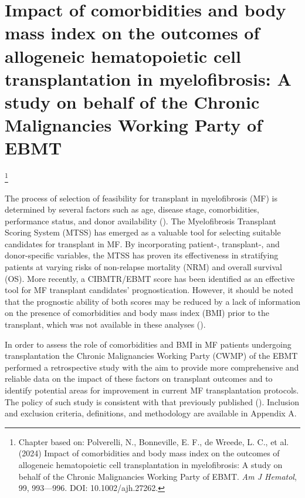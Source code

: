 \documentclass[
  letterpaper,
  paper=240mm:170mm,
  twoside=true,
  open=right,
  fontsize=10pt,
  pagesize=false,
  BCOR=15mm,
  DIV=14,
  headinclude=true,
  footinclude=false,
  headsepline=on]{scrbook}
\newcommand\blfootnote[1]{%
  \begingroup
  \renewcommand\thefootnote{}\footnote{#1}%
  \addtocounter{footnote}{-1}%
  \endgroup
}
\begin{document}

\chapter{Impact of comorbidities and body mass index on the outcomes of
allogeneic hematopoietic cell transplantation in myelofibrosis: A study
on behalf of the Chronic Malignancies Working Party of
EBMT}\label{sec-chap-polverelli}


\blfootnote{Chapter based on: Polverelli, N., Bonneville, E. F., de Wreede, L. C., et al. (2024) Impact of comorbidities and body mass index on the outcomes of allogeneic hematopoietic cell transplantation in myelofibrosis: A study on behalf of the Chronic Malignancies Working Party of EBMT. \textit{Am J Hematol}, 99, 993—996. DOI: 10.1002/ajh.27262.}

\clearpage

The process of selection of feasibility for transplant in myelofibrosis
(MF) is determined by several factors such as age, disease stage,
comorbidities, performance status, and donor availability
(). The Myelofibrosis Transplant Scoring System
(MTSS) has emerged as a valuable tool for selecting suitable candidates
for transplant in MF. By incorporating patient-, transplant-, and
donor-specific variables, the MTSS has proven its effectiveness in
stratifying patients at varying risks of non-relapse mortality (NRM) and
overall survival (OS). More recently, a CIBMTR/EBMT score has been
identified as an effective tool for MF transplant candidates'
prognostication. However, it should be noted that the prognostic ability
of both scores may be reduced by a lack of information on the presence
of comorbidities and body mass index (BMI) prior to the transplant,
which was not available in these analyses
().

In order to assess the role of comorbidities and BMI in MF patients
undergoing transplantation the Chronic Malignancies Working Party (CWMP)
of the EBMT performed a retrospective study with the aim to provide more
comprehensive and reliable data on the impact of these factors on
transplant outcomes and to identify potential areas for improvement in
current MF transplantation protocols. The policy of such study is
consistent with that previously published
(). Inclusion and exclusion criteria, definitions, and
methodology are available in Appendix A.
\end{document}

